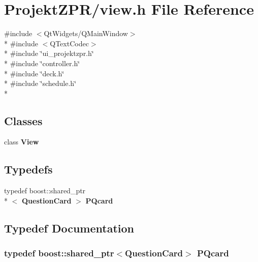 \section{Projekt\-Z\-P\-R/view.h File Reference}
\label{view_8h}
{\ttfamily \#include $<$Qt\-Widgets/\-Q\-Main\-Window$>$}\\*
{\ttfamily \#include $<$Q\-Text\-Codec$>$}\\*
{\ttfamily \#include \char`\"{}ui\-\_\-projektzpr.\-h\char`\"{}}\\*
{\ttfamily \#include \char`\"{}controller.\-h\char`\"{}}\\*
{\ttfamily \#include \char`\"{}deck.\-h\char`\"{}}\\*
{\ttfamily \#include \char`\"{}schedule.\-h\char`\"{}}\\*
\subsection*{Classes}
\begin{DoxyCompactItemize}
\item 
class {\bf View}
\end{DoxyCompactItemize}
\subsection*{Typedefs}
\begin{DoxyCompactItemize}
\item 
typedef boost\-::shared\-\_\-ptr\\*
$<$ {\bf Question\-Card} $>$ {\bf P\-Qcard}
\end{DoxyCompactItemize}


\subsection{Typedef Documentation}
\subsubsection[{P\-Qcard}]{\setlength{\rightskip}{0pt plus 5cm}typedef boost\-::shared\-\_\-ptr$<${\bf Question\-Card}$>$ {\bf P\-Qcard}}\label{view_8h_a54008efd53547f8511ef43fe2fcc1b70}

